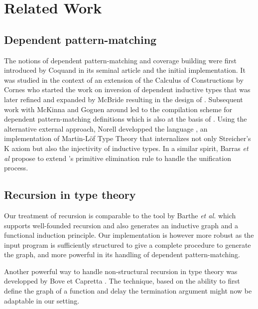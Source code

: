 \section{Related Work}
\label{sec:related-work}

\subsection{Dependent pattern-matching}
The notions of dependent pattern-matching and coverage building were
first introduced by Coquand in its seminal article
\cite{coquand92baastad} and the initial  implementation.
It was studied in the context of an extension of the Calculus of
Constructions by Cornes \cite{CornesPhD,DBLP:conf/types/CornesT95} who
started the work on
inversion of dependent inductive types that was later refined and
expanded by McBride resulting in the design of 
\cite{mcbride00dependently}. Subsequent work with McKinna and Goguen
around \Epigram
\cite{mcbride:concon,DBLP:journals/jfp/McBrideM04,DBLP:conf/birthday/GoguenMM06}
led to the compilation scheme for dependent pattern-matching definitions
which is also at the basis of \Equations. Using the alternative external approach,
Norell developped the  language \cite{norell:thesis}, an
implementation of Martin-Löf Type Theory that internalizes not only
Streicher's K axiom but also the injectivity of inductive types.
In a similar spirit, Barras {\it et al} \cite{conf/types/BarrasCGHS08}
propose to extend \Coq's primitive elimination rule to handle the
unification process.

\subsection{Recursion in type theory}

Our treatment of recursion is comparable to the  tool by
Barthe {\it et al.} \cite{Barthe:2006gp} which supports well-founded
recursion and also generates an inductive graph and a functional
induction principle. Our implementation is however more robust as the
input program is sufficiently structured to give a complete procedure to
generate the graph, and more powerful in its handling of dependent
pattern-matching. 

Another powerful way to handle non-structural recursion in type theory
was developped by Bove et Capretta \cite{journals/mscs/BoveC05}. The
technique, based on the ability to first define the graph of a function
and delay the termination argument might now be adaptable in our
setting.

